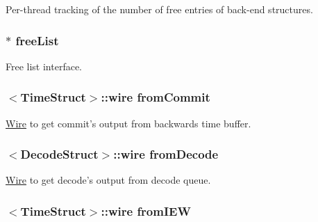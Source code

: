 \label{classDefaultRename_a20d0243bc02977001bfbd4834a7d8b5d}
Per-\/thread tracking of the number of free entries of back-\/end structures. \hypertarget{classDefaultRename_a2e829c52dbc56e7ac6d2fc6a0524ff9c}{
\subsubsection[{freeList}]{$\ast$ {\bf freeList}}}
\label{classDefaultRename_a2e829c52dbc56e7ac6d2fc6a0524ff9c}
Free list interface. \hypertarget{classDefaultRename_a0055a92bd94eda21c2641d46ff013dac}{
\subsubsection[{fromCommit}]{$<${\bf TimeStruct}$>$::wire {\bf fromCommit}}}
\label{classDefaultRename_a0055a92bd94eda21c2641d46ff013dac}
\hyperlink{classWire}{Wire} to get commit's output from backwards time buffer. \hypertarget{classDefaultRename_a8bf861a7b2c3731d3a69bf370564e975}{
\subsubsection[{fromDecode}]{$<${\bf DecodeStruct}$>$::wire {\bf fromDecode}}}
\label{classDefaultRename_a8bf861a7b2c3731d3a69bf370564e975}
\hyperlink{classWire}{Wire} to get decode's output from decode queue. \hypertarget{classDefaultRename_a6c9093e88770a58dc8853f49a09bbac8}{
\subsubsection[{fromIEW}]{$<${\bf TimeStruct}$>$::wire {\bf fromIEW}}}
